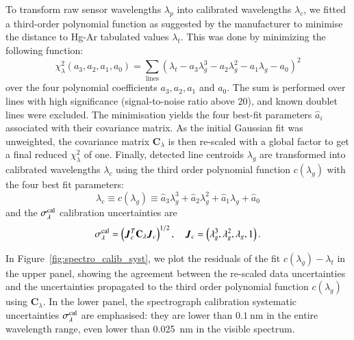 To transform raw sensor wavelengths $\lambda_p$ into calibrated wavelengths $\lambda_c$, we fitted a third-order polynomial function as suggested by the manufacturer to minimise the distance to Hg-Ar tabulated values $\lambda_t$. This was done by minimizing the following function: 
\begin{equation}
    \chi_\lambda^2(a_3, a_2, a_1, a_0) = \sum_{\text{lines}} \left(\lambda_t-a_3 \lambda_g^3 - a_2 \lambda_g^2-a_1 \lambda_g -a_0\right)^2
\end{equation}
over the four polynomial coefficients $a_3, a_2, a_1$ and $a_0$. The sum is performed over lines with high significance (signal-to-noise ratio above 20), and known doublet lines were excluded. The minimisation yields  the four best-fit parameters $\hat a_i$ associated with their covariance matrix. 
As the initial Gaussian fit was unweighted, the covariance matrix $\mathbf{C}_\lambda$ is then re-scaled with a global factor to get a final reduced $\chi_\lambda^2$ of one. 
Finally, detected line centroids $\lambda_g$ are transformed into calibrated wavelengths $\lambda_c$ using the third order polynomial function $c(\lambda_g)$ with the four best fit parameters:  
\begin{equation}
    \lambda_c \equiv c(\lambda_g) \equiv \hat a_3 \lambda_g^3 + \hat a_2 \lambda_g^2+\hat a_1 \lambda_g +\hat a_0
\end{equation}
and the $\sigma_\lambda^{\rm cal}$ calibration uncertainties are
\begin{equation}
    \sigma_\lambda^{\rm cal} = \left(\vec J_c^T \mathbf{C}_\lambda \vec J_c\right)^{1/2},\quad \vec J_c = \left(\lambda_g^3, \lambda_g^2, \lambda_g, 1\right).
\end{equation}

In Figure~\ref{fig:spectro_calib_syst}, we plot the residuals of the fit $c(\lambda_g)-\lambda_t$ in the upper panel, showing the agreement between the re-scaled data uncertainties and the uncertainties propagated to the third order polynomial function $c(\lambda_g)$ using $\mathbf{C}_\lambda$. In the lower panel, the spectrograph calibration systematic uncertainties $\sigma_\lambda^{\rm cal}$ are emphasised: they are lower than $\SI{0.1}{\nm}$ in the entire wavelength range, even lower than \SI{0.025}{\nm} in the visible spectrum.


